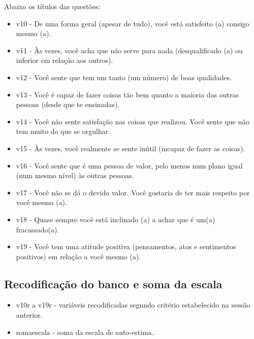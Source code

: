\documentclass[12pt]{article}
\begin{document}
Abaixo os títulos das questões:
\begin{itemize}
	\item v10 -  De uma forma geral (apesar de tudo), você está satisfeito (a) consigo mesmo (a).
	\item v11 - Às vezes, você acha que não serve para nada (desqualificado (a) ou inferior em relação aos outros).
	\item v12 - Você sente que tem um tanto (um número) de boas qualidades.
	\item v13 - Você é capaz de fazer coisas tão bem quanto a maioria das outras pessoas (desde que te ensinadas).
	\item v14 - Você não sente satisfação nas coisas que realizou. Você sente que não tem muito do que se orgulhar.
	\item v15 - Às vezes, você realmente se sente inútil (incapaz de fazer as coisas).
	\item v16 - Você sente que é uma pessoa de valor, pelo menos num plano igual (num mesmo nível) às outras pessoas.
	\item v17 - Você não se dá o devido valor. Você gostaria de ter mais respeito por você mesmo (a).
	\item v18 - Quase sempre você está inclinado (a) a achar que é um(a) fracassado(a).
	\item v19 - Você tem uma atitude positiva (pensamentos, atos e sentimentos positivos) em relação a você mesmo (a).
\end{itemize}

\subsection{Recodificação do banco e soma da escala}
\begin{itemize}
	\item v10r a v19r - variáveis recodificadas segundo critério estabelecido na sessão anterior.
	\item somaescala - soma da escala de auto-estima. 
\end{itemize}
\end{document}
